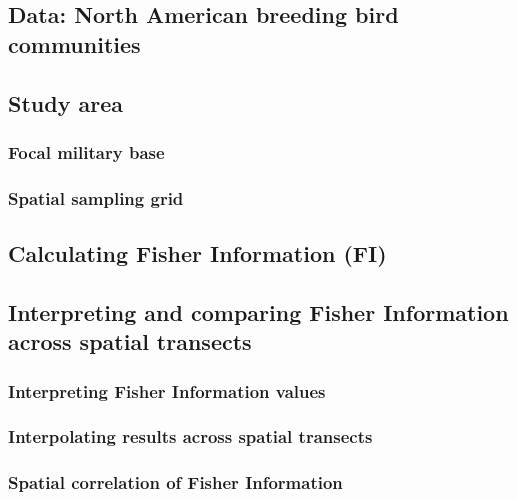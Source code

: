 \documentclass[12pt,twoside,openany]{reedthesis}
\begin{document}
\subsection{Data: North American breeding bird
communities}\label{data-north-american-breeding-bird-communities}

\subsection{Study area}\label{study-area}

\subsubsection{Focal military base}\label{focal-military-base}

\subsubsection{Spatial sampling grid}\label{spatial-sampling-grid}

\subsection{Calculating Fisher Information
(FI)}\label{calculating-fisher-information-fi}

\subsection{Interpreting and comparing Fisher Information across spatial
transects}\label{interpreting-and-comparing-fisher-information-across-spatial-transects}

\subsubsection{Interpreting Fisher Information
values}\label{interpreting-fisher-information-values}

\subsubsection{Interpolating results across spatial
transects}\label{interpolating-results-across-spatial-transects}

\subsubsection{Spatial correlation of Fisher
Information}\label{spatial-correlation-of-fisher-information}
\end{document}
